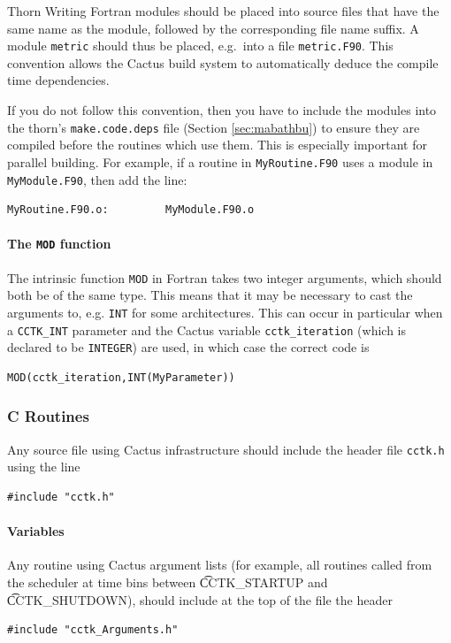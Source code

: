\begin{cactuspart}{Thorn Writing}
Fortran modules should be placed into source files that have the same
name as the module, followed by the corresponding file name suffix.  A
module \texttt{metric} should thus be placed, e.g.\ into a file
\texttt{metric.F90}.  This convention allows the Cactus build system
to automatically deduce the compile time dependencies.

If you do not follow this convention, then you have to include the
modules into the thorn's \texttt{make.code.deps} file
(Section \ref{sec:mabathbu}) to ensure they are compiled before the routines
which use them.  This is especially important for parallel building.
For example, if a routine in \texttt{MyRoutine.F90} uses a module in {\tt
MyModule.F90}, then add the line:
%
\begin{verbatim}
MyRoutine.F90.o:         MyModule.F90.o
\end{verbatim}

\paragraph{The \texttt{MOD} function}

The intrinsic function \texttt{MOD} in Fortran takes two integer
arguments, which should both be of the same type. This means
that it may be necessary to cast the arguments to, e.g.
\texttt{INT} for some architectures. This can occur in particular
when a \texttt{CCTK\_INT} parameter and the Cactus variable \texttt{cctk\_iteration}
(which is declared to be \texttt{INTEGER}) are used,
in which case the correct code is
\begin{verbatim}
MOD(cctk_iteration,INT(MyParameter))
\end{verbatim}


\subsubsection{C Routines}

Any source file using Cactus infrastructure should include
the header file \texttt{cctk.h} using the line
\begin{verbatim}
#include "cctk.h"
\end{verbatim}

\paragraph{Variables}

Any routine using Cactus argument lists (for example, all routines called from
the scheduler at time bins between {\t CCTK\_STARTUP} and {\t CCTK\_SHUTDOWN}),
should include at the top of the file the header
\begin{verbatim}
#include "cctk_Arguments.h"
\end{verbatim}


\end{cactuspart}
